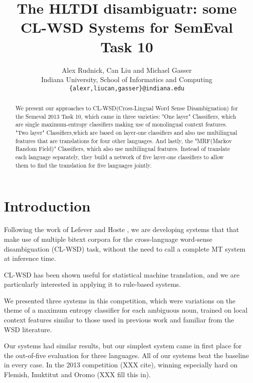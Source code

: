 \documentclass[11pt,letterpaper]{article}
\title{The HLTDI disambiguatr: some CL-WSD Systems for SemEval Task 10}
\author{Alex Rudnick, Can Liu and Michael Gasser\\
	    Indiana University, School of Informatics and Computing \\
	    {\tt \{alexr,liucan,gasser\}@indiana.edu}}
\date{}
\begin{document}
\maketitle

\begin{abstract}
We present our approaches to CL-WSD(Cross-Lingual Word Sense Disambiguation) for the Semeval 2013 Task 10, which came in
three varieties: 
"One layer" Classifiers, which are single maximum-entropy classifiers making use of monolingual context features. %
 "Two layer" Classifiers,which are based on layer-one classifiers and also use multilingual features that are translations for four other languages. 
And lastly, the "MRF(Markov Random Field)" Classifiers, which also use multilingual features. Instead of translate each language separately, they build a network of five layer-one classifiers to allow them to find the translation for five languages jointly.%
\end{abstract}

\section{Introduction}
Following the work of Lefever and Hoste
, we are developing systems
that that make use of multiple bitext corpora for the cross-language word-sense
disambiguation (CL-WSD) task, without the need to call a complete MT system at
inference time.

CL-WSD has been shown useful for statistical machine translation, and we are
particularly interested in applying it to rule-based systems.


We presented three systems in this competition, which were variations on the
theme of a maximum entropy classifier for each ambiguous noun, trained on local
context features similar to those used in previous work and familiar from the
WSD literature.


Our systems had similar results, but our simplest system came in first place
for the out-of-five evaluation for three languages. All of our systems beat the
baseline in every case.  In the 2013 competition (XXX cite), winning especially
hard on Flemish, Inuktitut and Oromo (XXX fill this in).
\end{document}
